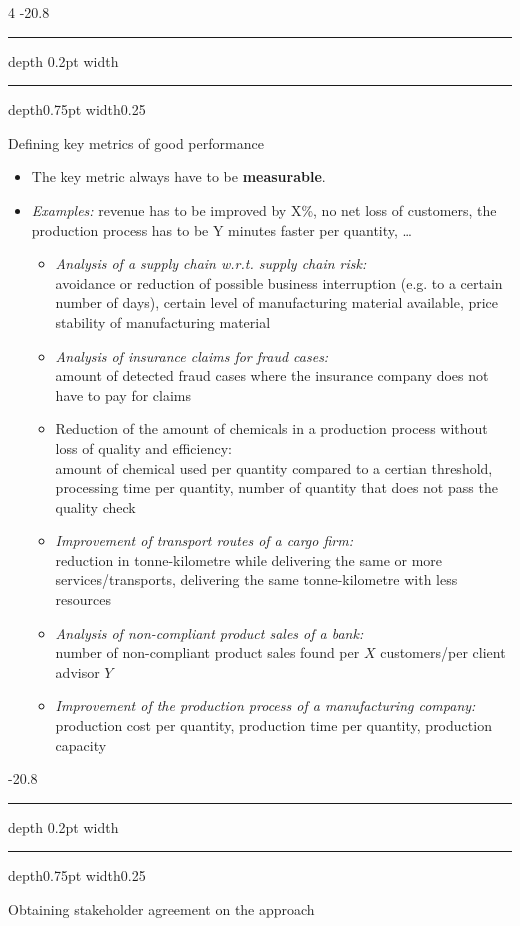 \documentclass[a4paper, landscape, 6pt, fleqn]{scrartcl}
\makeatletter
\renewcommand{\emph}[1]{\textbf{#1}}
\renewcommand{\subsection}{\@startsection{subsection}{1}{0mm}%
{-2\baselineskip}{0.8\baselineskip}%
{\hrule depth 0.2pt width\columnwidth\hrule depth0.75pt
width0.25\columnwidth\vspace*{1.2em}\large\bfseries}}
\makeatother
\begin{document}
\begin{multicols*}{4}
\subsection{Defining key metrics of good performance}

\begin{itemize}
\item The key metric always have to be \emph{measurable}.
\item \textit{Examples:} revenue has to be improved by X\%, no net loss of customers, the production process has to be Y minutes faster per quantity, \ldots
\begin{itemize}
\item \textit{Analysis of a supply chain w.r.t. supply chain risk:} \\
avoidance or reduction of possible business interruption (e.g. to a certain number of days), certain level of manufacturing material available, price stability of manufacturing material
\item \textit{Analysis of insurance claims for fraud cases:} \\
amount of detected fraud cases where the insurance company does not have to pay for claims
\item Reduction of the amount of chemicals in a production process without loss of quality and efficiency: \\
amount of chemical used per quantity compared to a certian threshold, processing time per quantity, number of quantity that does not pass the quality check
\item \textit{Improvement of transport routes of a cargo firm:} \\
reduction in tonne-kilometre while delivering the same or more services/transports, delivering the same tonne-kilometre with less resources
\item \textit{Analysis of non-compliant product sales of a bank:} \\
number of non-compliant product sales found per $X$ customers/per client advisor $Y$
\item \textit{Improvement of the production process of a manufacturing company:} \\
production cost per quantity, production time per quantity, production capacity
\end{itemize}
\end{itemize}

\subsection{Obtaining stakeholder agreement on the approach}


\end{multicols*}
\end{document}
